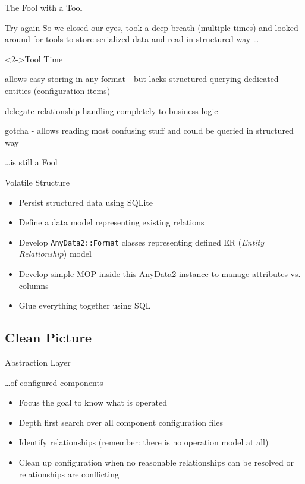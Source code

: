 \documentclass[ngerman,xcolor={table,dvipsnames},smaller,compress,hyperref={bookmarks,colorlinks}]{beamer}%
\begin{document}
\begin{frame}[fragile]{The Fool with a Tool}
\begin{block}{Try again}
So we closed our eyes, took a deep breath (multiple times) and looked around for tools to store serialized data and read in structured way \ldots
\end{block}
\begin{block}<2->{Tool Time}
\begin{description}
\item[MongoDB]<2-> allows easy storing in any format - but lacks structured querying dedicated entities (configuration items)
\item[Data Files]<3-> delegate relationship handling completely to business logic
\item[AnyData2]<4-> gotcha - allows reading most confusing stuff and could be queried in structured way
\end{description}
\end{block}
\end{frame}

\begin{frame}[fragile]{\ldots is still a Fool}
\begin{block}{Volatile Structure}
\begin{itemize}
\item Persist structured data using SQLite
\item<2-> Define a data model representing existing relations
\item<3-> Develop \texttt{AnyData2::Format} classes representing defined ER (\textit{Entity Relationship}) model
\item<4-> Develop simple MOP inside this AnyData2 instance to manage attributes vs. columns
\item<5-> Glue everything together using SQL
\end{itemize}
\end{block}
\end{frame}

\subsection{Clean Picture}

\begin{frame}[fragile]{Abstraction Layer}
\begin{block}{\ldots of configured components}
\begin{itemize}
\item Focus the goal to know what is operated
\item<2-> Depth first search over all component configuration files
\item<3-> Identify relationships (remember: there is no operation model at all)
\item<4-> Clean up configuration when no reasonable relationships can be resolved or relationships are conflicting
\end{itemize}
\end{block}
\end{frame}
\end{document}

